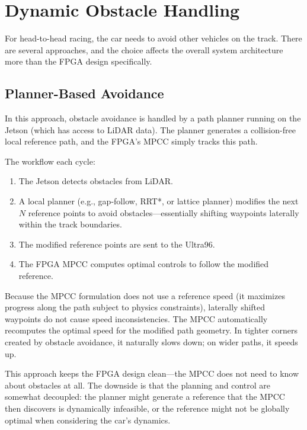 \documentclass[12pt,a4paper]{article}
\begin{document}
\section{Dynamic Obstacle Handling}

For head-to-head racing, the car needs to avoid other vehicles on the track. There are several approaches, and the choice affects the overall system architecture more than the FPGA design specifically.

\subsection{Planner-Based Avoidance}

In this approach, obstacle avoidance is handled by a path planner running on the Jetson (which has access to LiDAR data). The planner generates a collision-free local reference path, and the FPGA's MPCC simply tracks this path.

The workflow each cycle:
\begin{enumerate}
    \item The Jetson detects obstacles from LiDAR.
    \item A local planner (e.g., gap-follow, RRT*, or lattice planner) modifies the next $N$ reference points to avoid obstacles---essentially shifting waypoints laterally within the track boundaries.
    \item The modified reference points are sent to the Ultra96.
    \item The FPGA MPCC computes optimal controls to follow the modified reference.
\end{enumerate}

Because the MPCC formulation does not use a reference speed (it maximizes progress along the path subject to physics constraints), laterally shifted waypoints do not cause speed inconsistencies. The MPCC automatically recomputes the optimal speed for the modified path geometry. In tighter corners created by obstacle avoidance, it naturally slows down; on wider paths, it speeds up.

This approach keeps the FPGA design clean---the MPCC does not need to know about obstacles at all. The downside is that the planning and control are somewhat decoupled: the planner might generate a reference that the MPCC then discovers is dynamically infeasible, or the reference might not be globally optimal when considering the car's dynamics.
\end{document}

